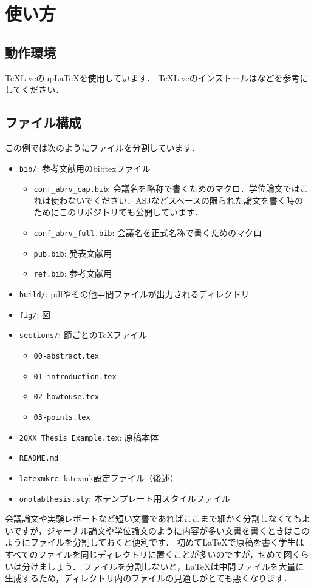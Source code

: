 \newcommand{\TeXLive}{\TeX{}Live}
\section{使い方}\label{sec:howtouse}
\subsection{動作環境}\label{subsec:requirements}
\TeXLive{}のup\LaTeX{}を使用しています．
\TeXLive{}のインストールは\cite{Okumura:2020:LaTeX,TeXWiki}などを参考にしてください．

\subsection{ファイル構成}
この例では次のようにファイルを分割しています．
\begin{itemize}
  \item \texttt{bib/}: 参考文献用のbibtexファイル
    \begin{itemize}
      \item \texttt{conf\_abrv\_cap.bib}: 会議名を略称で書くためのマクロ．学位論文ではこれは使わないでください．ASJなどスペースの限られた論文を書く時のためにこのリポジトリでも公開しています．
      \item \texttt{conf\_abrv\_full.bib}: 会議名を正式名称で書くためのマクロ
      \item \texttt{pub.bib}: 発表文献用
      \item \texttt{ref.bib}: 参考文献用
    \end{itemize}
  \item \texttt{build/}: pdfやその他中間ファイルが出力されるディレクトリ
  \item \texttt{fig/}: 図
  \item \texttt{sections/}: 節ごとのTeXファイル
    \begin{itemize}
      \item \texttt{00-abstract.tex}
      \item \texttt{01-introduction.tex}
      \item \texttt{02-howtouse.tex}
      \item \texttt{03-points.tex}
    \end{itemize}
  \item \texttt{20XX\_Thesis\_Example.tex}: 原稿本体
  \item \texttt{README.md}
  \item \texttt{latexmkrc}: latexmk設定ファイル（後述）
  \item \texttt{onolabthesis.sty}: 本テンプレート用スタイルファイル
\end{itemize}
会議論文や実験レポートなど短い文書であればここまで細かく分割しなくてもよいですが，ジャーナル論文や学位論文のように内容が多い文書を書くときはこのようにファイルを分割しておくと便利です．
初めて\LaTeX{}で原稿を書く学生はすべてのファイルを同じディレクトリに置くことが多いのですが，せめて図くらいは分けましょう．
ファイルを分割しないと，\LaTeX{}は中間ファイルを大量に生成するため，ディレクトリ内のファイルの見通しがとても悪くなります．

